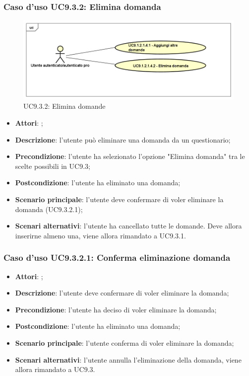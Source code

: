 		 \subsubsection{Caso d'uso UC9.3.2: Elimina domanda}
		 \label{UC9.3.2}
		 \begin{figure}[h]
		 	\centering
		 	\includegraphics[scale=0.5,keepaspectratio]{UML/UC9_3_2.png}
		 	\caption{UC9.3.2: Elimina domande}
		 \end{figure}
		 \FloatBarrier
		 \begin{itemize}
		 	\item \textbf{Attori}: \uaupro;
		 	\item \textbf{Descrizione}: l'utente può eliminare una domanda da un questionario;
		 	\item \textbf{Precondizione}: l'utente ha selezionato l'opzione "Elimina domanda" tra le scelte possibili in UC9.3;
		 	\item \textbf{Postcondizione}: l'utente ha eliminato una domanda;
		 	\item \textbf{Scenario principale}: l'utente deve confermare di voler eliminare la domanda (UC9.3.2.1); 
		 	\item \textbf{Scenari alternativi}: l'utente ha cancellato tutte le domande. Deve allora inserirne almeno una, viene allora rimandato a UC9.3.1.
		 \end{itemize}
		 
		 \subsubsection{Caso d'uso UC9.3.2.1: Conferma eliminazione domanda}
		 \label{UC9.3.2.1}
		 \begin{itemize}
		 	\item \textbf{Attori}: \uaupro;
		 	\item \textbf{Descrizione}: l'utente deve confermare di voler eliminare la domanda;
		 	\item \textbf{Precondizione}: l'utente ha deciso di voler eliminare la domanda;
		 	\item \textbf{Postcondizione}: l'utente ha eliminato una domanda;
		 	\item \textbf{Scenario principale}: l'utente conferma di voler eliminare la domanda;
		 	\item \textbf{Scenari alternativi}: l'utente annulla l'eliminazione della domanda, viene allora rimandato a UC9.3.
		 \end{itemize}
		 
